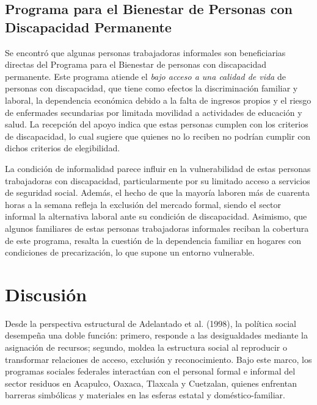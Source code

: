 \documentclass[
  spanish,
  11.5pt,
  170mm x 240mmpaper,
]{scrbook}
\begin{document}
\section{Programa para el Bienestar de Personas con Discapacidad
Permanente}\label{programa-para-el-bienestar-de-personas-con-discapacidad-permanente}

Se encontró que algunas personas trabajadoras informales son
beneficiarias directas del Programa para el Bienestar de personas con
discapacidad permanente. Este programa atiende el \emph{bajo acceso a
una calidad de vida} de personas con discapacidad, que tiene como
efectos la discriminación familiar y laboral, la dependencia económica
debido a la falta de ingresos propios y el riesgo de enfermades
secundarias por limitada movilidad a actividades de educación y salud.
La recepción del apoyo indica que estas personas cumplen con los
criterios de discapacidad, lo cual sugiere que quienes no lo reciben no
podrían cumplir con dichos criterios de elegibilidad.

La condición de informalidad parece influir en la vulnerabilidad de
estas personas trabajadoras con discapacidad, particularmente por su
limitado acceso a servicios de seguridad social. Además, el hecho de que
la mayoría laboren más de cuarenta horas a la semana refleja la
exclusión del mercado formal, siendo el sector informal la alternativa
laboral ante su condición de discapacidad. Asimismo, que algunos
familiares de estas personas trabajadoras informales reciban la
cobertura de este programa, resalta la cuestión de la dependencia
familiar en hogares con condiciones de precarización, lo que supone un
entorno vulnerable.


\chapter{Discusión}\label{discusiuxf3n}

Desde la perspectiva estructural de Adelantado et al. (1998), la
política social desempeña una doble función: primero, responde a las
desigualdades mediante la asignación de recursos; segundo, moldea la
estructura social al reproducir o transformar relaciones de acceso,
exclusión y reconocimiento. Bajo este marco, los programas sociales
federales interactúan con el personal formal e informal del sector
residuos en Acapulco, Oaxaca, Tlaxcala y Cuetzalan, quienes enfrentan
barreras simbólicas y materiales en las esferas estatal y
doméstico-familiar.
\end{document}
